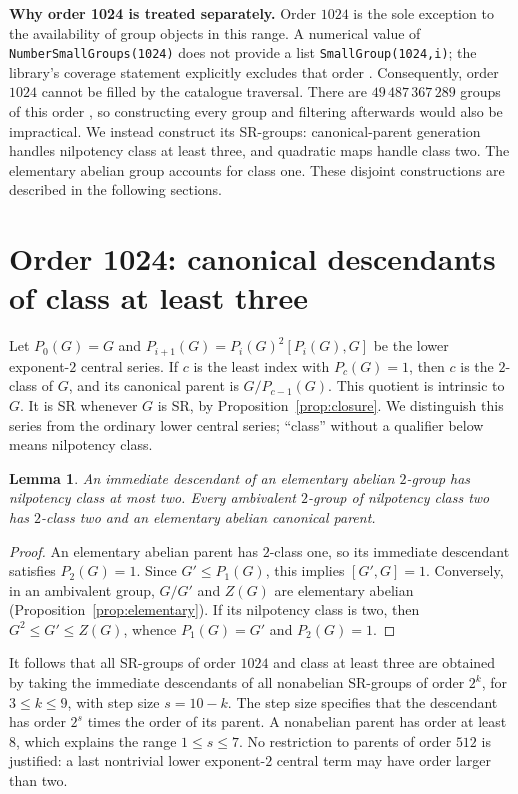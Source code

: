 \documentclass[11pt,a4paper]{amsart}
\newtheorem{lemma}[thm]{Lemma}
\theoremstyle{definition}
\theoremstyle{remark}
\numberwithin{equation}{section}
\begin{document}
\medskip\noindent\textbf{Why order 1024 is treated separately.}
Order $1024$ is the sole exception to the availability of group
objects in this range. A numerical value of
\texttt{NumberSmallGroups(1024)} does not provide a list
\texttt{SmallGroup(1024,i)}; the library's coverage statement
explicitly excludes that order \cite{SmallGrp}. Consequently,
order $1024$ cannot be filled by the catalogue traversal. There are $49\,487\,367\,289$ groups of this order \cite{Burrell22}, so constructing every group and filtering afterwards would also be impractical.
We instead construct its SR-groups: canonical-parent generation
handles nilpotency class at least three, and quadratic maps handle
class two. The elementary abelian group accounts for class one.
These disjoint constructions are described in the following sections.



\section{Order 1024: canonical descendants of class at least three}
\label{sec:1024higher}
Let $P_0(G)=G$ and
$P_{i+1}(G)=P_i(G)^2[P_i(G),G]$ be the lower exponent-$2$
central series. If $c$ is the least index with $P_c(G)=1$, then
$c$ is the $2$-class of $G$, and its canonical parent is
$G/P_{c-1}(G)$. This quotient is intrinsic to $G$.
It is SR whenever $G$ is SR, by Proposition~\ref{prop:closure}.
We distinguish this series from the ordinary lower central series;
``class'' without a qualifier below means nilpotency class.

\begin{lemma}\label{lem:parent}
An immediate descendant of an elementary abelian $2$-group has
nilpotency class at most two. Every ambivalent $2$-group of
nilpotency class two has $2$-class two and an elementary abelian
canonical parent.
\end{lemma}
\begin{proof}
An elementary abelian parent has $2$-class one, so its immediate
descendant satisfies $P_2(G)=1$. Since $G'\leq P_1(G)$, this
implies $[G',G]=1$. Conversely, in an ambivalent group,
$G/G'$ and $Z(G)$ are elementary abelian
(Proposition~\ref{prop:elementary}). If its nilpotency class is
two, then $G^2\leq G'\leq Z(G)$, whence $P_1(G)=G'$ and
$P_2(G)=1$.
\end{proof}

It follows that all SR-groups of order $1024$ and class at least
three are obtained by taking the immediate descendants of all
nonabelian SR-groups of order $2^k$, for $3\leq k\leq9$, with
step size $s=10-k$. The step size specifies that the descendant
has order $2^s$ times the order of its parent. A nonabelian parent
has order at least $8$, which explains the range $1\leq s\leq7$.
No restriction to parents of order $512$ is justified: a last
nontrivial lower exponent-$2$ central term may have order larger
than two.
\end{document}
